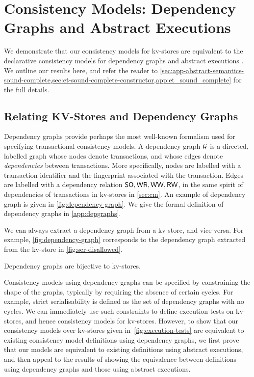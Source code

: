 \section{Consistency Models: Dependency Graphs and Abstract Executions}
\label{sec:other_formalisms}


We demonstrate that our consistency models for kv-stores
are equivalent to the declarative consistency models for 
dependency graphs \cite{adya} 
and abstract executions \cite{ev_transactions,framework-concur}. 
We outline our results here, and refer the reader
to \cref{sec:app-abstract-semantics-sound-complete,sec:et-sound-complete-constructor,app:et_sound_complete} for the full details.


\subsection{Relating KV-Stores and Dependency Graphs}
\label{sec:dep_graphs}
Dependency graphs \cite{adya-icde,adya} provide  perhaps the most
well-known 
formalism used for specifying transactional consistency models. 
A dependency graph \(\mathcal{G}\) is a directed, labelled graph whose 
nodes denote transactions, and whose edges denote \emph{dependencies} between transactions.  
More specifically, nodes are labelled with a transaction identifier
and the fingerprint associated with the  transaction. 
Edges are labelled with a dependency relation \(\mathsf{SO}, \mathsf{WR}, \mathsf{WW}, \mathsf{RW}\), in the 
same spirit of dependencies of transactions in kv-stores in \cref{sec:cm}.
An example of dependency graph is given in \cref{fig:dependency-graph}.
We give the formal definition of dependency graphs in \cref{app:depgraphs}.

We can always {extract} a dependency graph  from a kv-store, and vice-versa. 
For example, \cref{fig:dependency-graph} corresponds to the dependency graph extracted from the kv-store in \cref{fig:ser-disallowed}. 
\begin{theorem}
\label{thm:kv_graph_isomorph}
Dependency graphs are bijective to kv-stores.
\end{theorem}



Consistency models using dependency graphs can be specified by
constraining the shape of the graphs, typically by requiring the absence of certain cycles.  For example, strict serialisability is defined as
the set of dependency graphs with no cycles. %
We can immediately use such constraints to define execution tests on
kv-stores, and hence consistency models for kv-stores. However, to show 
that our consistency models over kv-stores given in~\cref{fig:execution-tests} are equivalent
to existing consistency model definitions using dependency graphs,
we first prove that our models are equivalent
to existing definitions using abstract executions, and then appeal 
to the results of \citet{laws} showing the equivalence between definitions using dependency graphs and those using abstract executions.  


